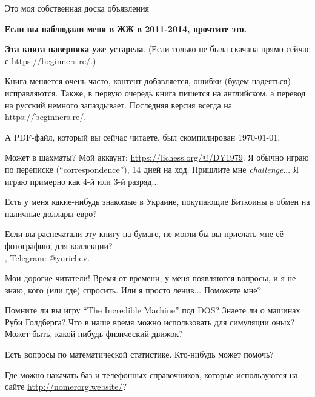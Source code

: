
\begin{center}
\LARGE{} Это моя собственная доска объявления \normalsize{}
\end{center}

\textbf{Если вы наблюдали меня в ЖЖ в 2011-2014, прочтите \href{http://link.yurichev.com/46001}{это}.}

\myhrule{}

\textbf{Эта книга наверняка уже устарела}.
(Если только не была скачана прямо сейчас с \url{https://beginners.re/}.)

Книга \href{\GitHubURL/commits/master}{меняется очень часто},
контент добавляется, ошибки (будем надеяться) исправляются.
Также, в первую очередь книга пишется на английском, а перевод на русский немного запаздывает.
Последняя версия всегда на \url{https://beginners.re/}.

А PDF-файл, который вы сейчас читаете, был скомпилирован \today{}.

\myhrule{}

Может в шахматы?
Мой аккаунт: \url{https://lichess.org/@/DY1979}.
Я обычно играю по переписке (``correspondence''), 14 дней на ход.
Пришлите мне \textit{challenge}...
Я играю примерно как 4-й или 3-й разряд...

\myhrule{}

Есть у меня какие-нибудь знакомые в Украине, покупающие Биткоины в обмен на наличные доллары-евро?

\myhrule{}

Если вы распечатали эту книгу на бумаге, не могли бы вы прислать мне её фотографию, для коллекции?\\
\EMAIL{}, Telegram: @yurichev.

\myhrule{}

Мои дорогие читатели! Время от времени, у меня появляются вопросы, и я не знаю, кого (или где) спросить.
Или я просто ленив...
Поможете мне?

\myhrule{}

Помните ли вы игру ``The Incredible Machine'' под DOS?
Знаете ли о машинах Руби Голдберга?
Что в наше время можно использовать для симуляции оных?
Может быть, какой-нибудь физический движок?

\myhrule{}

Есть вопросы по математической статистике. Кто-нибудь может помочь?

\myhrule{}

Где можно накачать баз и телефонных справочников, которые используются на сайте \url{http://nomerorg.website/}?

